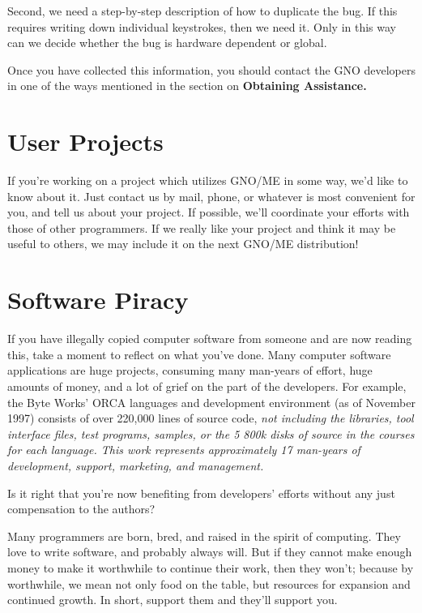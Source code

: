 \documentclass{report}
\begin{document}
Second, we need a step-by-step description
of how to duplicate the bug. If this requires writing down
individual keystrokes, then we need it. Only in this way can we
decide whether the bug is hardware dependent or global.

Once you have collected this information, you should contact the 
GNO developers in one of the ways mentioned in the section on
\bf Obtaining Assistance\rm.

\section{User Projects}

If you're working on a project which
utilizes GNO/ME in some way, we'd like to know about it. Just
contact us by mail, phone, or whatever is most convenient for
you, and tell us about your project. If possible, we'll
coordinate your efforts with those of other programmers. If we
really like your project and think it may be useful to others, we
may include it on the next GNO/ME distribution!

\section{Software Piracy}

If you have illegally copied computer software from someone
and are now reading this, take a moment to reflect on what you've done.
Many computer software applications are huge projects, consuming
many man-years of effort, huge amounts of money, and a lot of grief on the
part of the developers.
For example, the Byte Works' ORCA languages and development 
environment (as of November 1997) consists of over 220,000 lines
of source code, \em not \rm including the libraries, tool 
interface files, test programs, samples, or the 5 800k disks
of source in the courses for each language.  This work represents
approximately 17 man-years of development, support, marketing,
and management.

Is it right that you're now benefiting from
developers' efforts without any just compensation to the authors?

Many programmers are born, bred, and raised in the spirit of
computing. They love to write software, and probably always
will. But if they cannot make enough money to make it
worthwhile to continue their work, then they won't; because by
worthwhile, we mean not only food on the table, but resources for
expansion and continued growth. In short,
support them and they'll support you.
 
\end{document}
